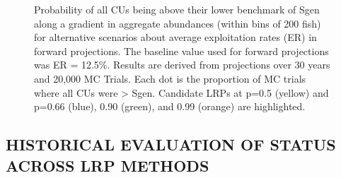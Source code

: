 \documentclass[11pt]{book}
\begin{document}
\begin{figure}[htb]

{\centering {} 

}

\caption{Probability of all CUs being above their lower benchmark of Sgen along a gradient in aggregate abundances (within bins of 200 fish) for alternative scenarios about average exploitation rates (ER) in forward projections. The baseline value used for forward projections was ER = 12.5\%. Results are derived from projections over 30 years and 20,000 MC Trials. Each dot is the proportion of MC trials where all CUs were > Sgen.  Candidate LRPs at p=0.5 (yellow) and p=0.66 (blue), 0.90 (green), and 0.99 (orange) are highlighted.}\label{fig:coho-projLRPCurve-byER}
\end{figure}
\hypertarget{historical-evaluation-of-status-across-lrp-methods}{%
\subsection{HISTORICAL EVALUATION OF STATUS ACROSS LRP METHODS}\label{historical-evaluation-of-status-across-lrp-methods}}
\end{document}
